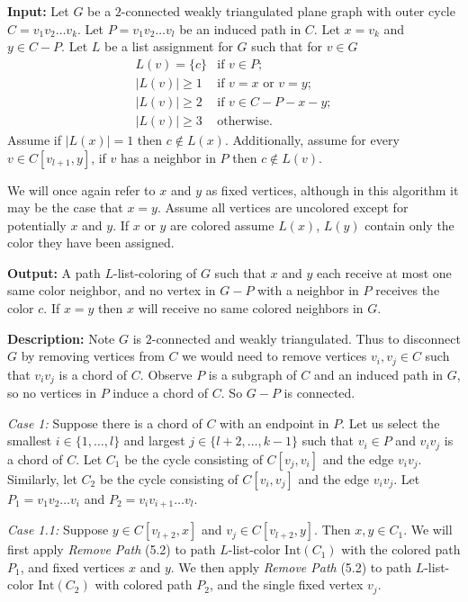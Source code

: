 \documentclass[letterpaper, 12pt]{article}
\theoremstyle{definition}
\theoremstyle{definition}
\theoremstyle{thm}
\theoremstyle{definition}
\begin{document}
\noindent\textbf{Input:} Let $G$ be a $2$-connected weakly triangulated plane
graph with outer cycle $C=v_1v_2\ldots v_k$. Let $P=v_1v_2\ldots v_l$ be an
induced path in $C$. Let $x=v_k$ and $y\in C-P$. Let $L$ be a list
assignment for $G$ such that for $v\in G$
\[
    \begin{array}{ll}
        L(v)=\{c\} & \text{if } v\in P;\\
	    |L(v)|\ge 1 & \text{if } v=x \text{ or } v=y;\\
	    |L(v)|\ge 2 & \text{if } v\in C-P-x-y;\\
	    |L(v)|\ge 3 & \text{otherwise.}
    \end{array}
\]
Assume if $|L(x)|=1$ then $c\not\in L(x)$. Additionally, assume for every
$v\in C[v_{l+1},y]$, if $v$ has a neighbor in $P$ then $c\not\in L(v)$.

We will once again refer to $x$ and $y$ as fixed vertices, although in this
algorithm it may be the case that $x=y$. Assume all
vertices are uncolored except for potentially $x$ and $y$. If $x$ or $y$ are
colored assume $L(x)$, $L(y)$ contain only the color they have been assigned.

\noindent\textbf{Output:} A path $L$-list-coloring of $G$ such that $x$ and
$y$ each receive at most one same color neighbor, and no vertex in
$G-P$ with a neighbor in $P$ receives the color $c$. If $x=y$ then $x$ will
receive no same colored neighbors in $G$.

\noindent\textbf{Description:}
Note $G$ is $2$-connected and weakly triangulated. Thus to disconnect $G$ by
removing vertices from $C$ we would need to remove vertices
$v_i,v_j\in C$ such that $v_iv_j$ is a chord of $C$.
Observe $P$ is a subgraph of $C$ and an induced path in $G$, so no vertices in
$P$ induce a chord of $C$. So $G-P$ is connected.

\textit{Case 1:} Suppose there is a chord of $C$ with an endpoint in $P$. Let us
select the smallest $i\in\{1,\ldots,l\}$ and largest $j\in\{l+2,\ldots,k-1\}$
such that $v_i\in P$ and $v_iv_j$ is a chord of $C$. Let $C_1$ be the cycle
consisting of $C[v_j,v_i]$ and the edge $v_iv_j$. Similarly, let $C_2$ be the
cycle consisting of $C[v_i,v_j]$ and the edge $v_iv_j$. Let
$P_1=v_1v_2\ldots v_i$ and $P_2=v_iv_{i+1}\ldots v_l$.

\textit{Case 1.1:} Suppose $y\in C[v_{l+2},x]$ and $v_j\in C[v_{l+2},y]$.
Then $x,y\in C_1$. We will first apply \textit{Remove Path} (5.2) to path
$L$-list-color $\text{Int}(C_1)$ with the colored path $P_1$, and fixed vertices
$x$ and $y$. We then apply \textit{Remove Path} (5.2)
to path $L$-list-color $\text{Int}(C_2)$ with colored path $P_2$, and the single
fixed vertex $v_j$.
\end{document}
